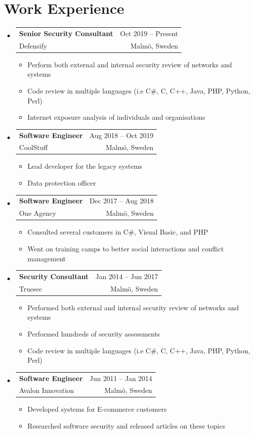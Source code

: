 \documentclass[A4,11pt]{article}
\makeatletter
\newcommand{\CVItem}[1]{
  \item\small{
    {#1 \vspace{-2pt}}
  }
}
\newcommand{\CVSubheading}[4]{
  \vspace{-2pt}\item
    \begin{tabular*}{0.97\textwidth}[t]{l@{\extracolsep{\fill}}r}
      \textbf{#1} & #2 \\
      \small#3 & \small #4 \\
    \end{tabular*}\vspace{-7pt}
}
\newcommand{\CVSubHeadingListStart}{\begin{itemize}[leftmargin=0.5cm, label={}]}
\newcommand{\CVSubHeadingListEnd}{\end{itemize}}
\newcommand{\CVItemListStart}{\begin{itemize}}
\newcommand{\CVItemListEnd}{\end{itemize}\vspace{-5pt}}
\makeatother
\begin{document}
\section{Work Experience}
  \CVSubHeadingListStart
    \CVSubheading
      {Senior Security Consultant}{Oct 2019 -- Present}
      {Defensify}{Malmö, Sweden}
      \CVItemListStart
        \CVItem{Perform both external and internal security review of networks and systems}
        \CVItem{Code review in multiple languages (i.e C\#, C, C++, Java, PHP, Python, Perl)}
        \CVItem{Internet exposure analysis of individuals and organisations}
      \CVItemListEnd
    \CVSubheading
      {Software Engineer}{Aug 2018 -- Oct 2019}
      {CoolStuff}{Malmö, Sweden}
      \CVItemListStart
        \CVItem{Lead developer for the legacy systems}
        \CVItem{Data protection officer}
    \CVItemListEnd
    \CVSubheading
      {Software Engineer}{Dec 2017 -- Aug 2018}
      {One Agency}{Malmö, Sweden}
      \CVItemListStart
        \CVItem{Consulted several customers in C\#, Visual Basic, and PHP}
        \CVItem{Went on training camps to better social interactions and conflict management}
      \CVItemListEnd
    \CVSubheading
      {Security Consultant}{Jan 2014 -- Jun 2017}
      {Truesec}{Malmö, Sweden}
      \CVItemListStart
        \CVItem{Performed both external and internal security review of networks and systems}
        \CVItem{Performed hundreds of security assessments}
        \CVItem{Code review in multiple languages (i.e C\#, C, C++, Java, PHP, Python, Perl)}
      \CVItemListEnd
    \CVSubheading
      {Software Engineer}{Jun 2011 -- Jan 2014}
      {Avalon Innovation}{Malmö, Sweden}
      \CVItemListStart
        \CVItem{Developed systems for E-commerce customers}
        \CVItem{Researched software security and released articles on these topics}
      \CVItemListEnd
  \CVSubHeadingListEnd

\end{document}
